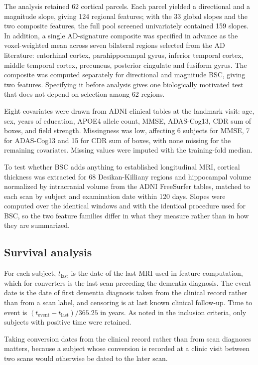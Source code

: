 \documentclass[blue]{ludusofficial}  %
\begin{document}
The analysis retained 62 cortical parcels. Each parcel yielded a directional and a magnitude slope, giving 124 regional features; with the 33 global slopes and the two composite features, the full pool screened univariately contained 159 slopes. In addition, a single AD-signature composite was specified in advance as the voxel-weighted mean across seven bilateral regions selected from the AD literature: entorhinal cortex, parahippocampal gyrus, inferior temporal cortex, middle temporal cortex, precuneus, posterior cingulate and fusiform gyrus. The composite was computed separately for directional and magnitude BSC, giving two features. Specifying it before analysis gives one biologically motivated test that does not depend on selection among 62 regions.

Eight covariates were drawn from ADNI clinical tables at the landmark visit: age, sex, years of education, APOE4 allele count, MMSE, ADAS-Cog13, CDR sum of boxes, and field strength. Missingness was low, affecting 6 subjects for MMSE, 7 for ADAS-Cog13 and 15 for CDR sum of boxes, with none missing for the remaining covariates. Missing values were imputed with the training-fold median.

To test whether BSC adds anything to established longitudinal MRI, cortical thickness was extracted for 68 Desikan-Killiany regions and hippocampal volume normalized by intracranial volume from the ADNI FreeSurfer tables, matched to each scan by subject and examination date within 120 days. Slopes were computed over the identical windows and with the identical procedure used for BSC, so the two feature families differ in what they measure rather than in how they are summarized.

\subsection{Survival analysis}

For each subject, $t_{\text{last}}$ is the date of the last MRI used in feature computation, which for converters is the last scan preceding the dementia diagnosis. The event date is the date of first dementia diagnosis taken from the clinical record rather than from a scan label, and censoring is at last known clinical follow-up. Time to event is $(t_{\text{event}} - t_{\text{last}})/365.25$ in years. As noted in the inclusion criteria, only subjects with positive time were retained.

Taking conversion dates from the clinical record rather than from scan diagnoses matters, because a subject whose conversion is recorded at a clinic visit between two scans would otherwise be dated to the later scan.
\end{document}
